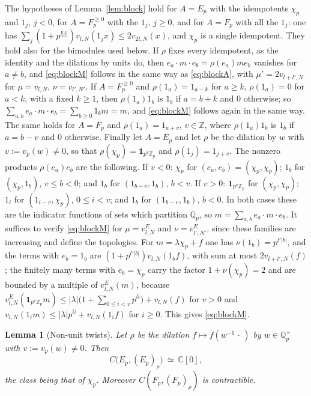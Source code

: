 \documentclass[11pt]{amsart}
\newtheorem{lemma}[theorem]{Lemma}
\theoremstyle{definition}
\theoremstyle{remark}
\newcommand{\C}{\mathbb C}
\newcommand{\Z}{\mathbb Z}
\newcommand{\Q}{\mathbb Q}
\begin{document}
The hypotheses of Lemma~\ref{lem:block} hold for $A=E_p$ with the idempotents
$\chi_p$ and $1_j$, $j<0$, for $A=F_p^{\ge0}$ with the $1_j$, $j\ge0$, and for
$A=F_p$ with all the $1_j$: one has
$\sum_j(1+p^{l|j|})v_{l,N}(1_jx)\le2v_{2l,N}(x)$, and $\chi_p$ is a single
idempotent.  They hold also for the bimodules used below.  If $\rho$ fixes every
idempotent, as the identity and the dilations by units do, then
$e_a\cdot m\cdot e_b=\rho(e_a)me_b$ vanishes for $a\ne b$, and
\eqref{eq:blockM} follows in the same way as \eqref{eq:blockA}, with
$\mu'=2v_{l+l',N}$ for $\mu=v_{l,N}$, $\nu=v_{l',N'}$.  If $A=F_p^{\ge0}$ and
$\rho(1_a)=1_{a-k}$ for $a\ge k$, $\rho(1_a)=0$ for $a<k$, with a fixed
$k\ge1$, then $\rho(1_a)1_b$ is $1_b$ if $a=b+k$ and $0$ otherwise; so
$\sum_{a,b}e_a\cdot m\cdot e_b=\sum_{b\ge0}1_bm=m$, and \eqref{eq:blockM}
follows again in the same way.  The same holds for $A=F_p$ and
$\rho(1_a)=1_{a+v}$, $v\in\Z$, where $\rho(1_a)1_b$ is $1_b$ if $a=b-v$ and
$0$ otherwise.  Finally let $A=E_p$ and let $\rho$ be the dilation
by $w$ with $v:=v_p(w)\ne0$, so that $\rho(\chi_p)=\mathbf 1_{p^{v}\Z_p}$ and
$\rho(1_j)=1_{j+v}$.  The nonzero products $\rho(e_a)e_b$ are the following.
If $v<0$: $\chi_p$ for $(e_a,e_b)=(\chi_p,\chi_p)$; $1_b$ for $(\chi_p,1_b)$,
$v\le b<0$; and $1_b$ for $(1_{b-v},1_b)$, $b<v$.  If $v>0$:
$\mathbf 1_{p^{v}\Z_p}$ for $(\chi_p,\chi_p)$; $1_i$ for $(1_{i-v},\chi_p)$,
$0\le i<v$; and $1_b$ for $(1_{b-v},1_b)$, $b<0$.  In both cases these are the
indicator functions of sets which partition $\Q_p$, so
$m=\sum_{a,b}e_a\cdot m\cdot e_b$.  It suffices to verify \eqref{eq:blockM} for $\mu=v^{E}_{l,N}$ and
$\nu=v^{E}_{l',N'}$, since these families are increasing and define the
topologies.  For $m=\lambda\chi_p+f$ one has $\nu(1_b)=p^{l'|b|}$, and the
terms with $e_b=1_b$ are $(1+p^{l'|b|})v_{l,N}(1_bf)$, with sum at most
$2v_{l+l',N}(f)$; the
finitely many terms with $e_b=\chi_p$ carry the factor $1+\nu(\chi_p)=2$ and
are bounded by a multiple of $v^{E}_{l,N}(m)$, because
$v^{E}_{l,N}(\mathbf 1_{p^{v}\Z_p}m)\le|\lambda|\bigl(1+\sum_{0\le i<v}p^{li}\bigr)
+v_{l,N}(f)$ for $v>0$ and $v_{l,N}(1_im)\le|\lambda|p^{li}+v_{l,N}(1_if)$ for
$i\ge0$.  This gives \eqref{eq:blockM}.

\begin{lemma}[Non-unit twists]\label{lem:nonunit}
Let $\rho$ be the dilation $f\mapsto f(w^{-1}\,\cdot\,)$ by
$w\in\Q_p^{\times}$ with $v:=v_p(w)\ne0$.  Then
\begin{equation}\label{eq:D1}
C\bigl(E_p,(E_p)_{\rho}\bigr)\ \simeq\ \C[0],
\end{equation}
the class being that of $\chi_p$.  Moreover $C(F_p,(F_p)_{\rho})$ is
contractible.
\end{lemma}
\end{document}
